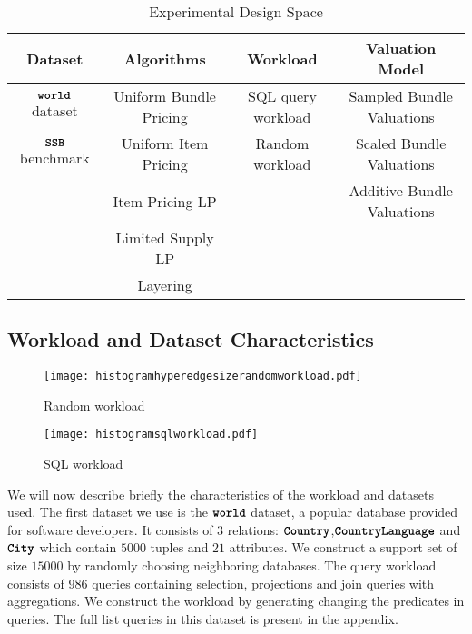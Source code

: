 \begin{table*} \centering
	\def\arraystretch{1.35}%
\begin{tabular}{c|c|c|c}
	\toprule
	\textbf{Dataset} & \textbf{Algorithms} & \textbf{Workload} & \textbf{Valuation Model}\\ \midrule
	$\texttt{\bfseries world}$ dataset & Uniform Bundle Pricing & SQL query workload & Sampled Bundle Valuations \\ 
	$\texttt{\bfseries SSB}$ benchmark & Uniform Item Pricing & Random workload & Scaled Bundle Valuations \\ 
 & Item Pricing LP &  & Additive Bundle Valuations \\ 
	 & Limited Supply LP & &  \\
	 	 & Layering &  &  \\
	\bottomrule
\end{tabular}
\caption{Experimental Design Space}
\label{table:experiments}
\end{table*}

\subsection{Workload and Dataset Characteristics}

\begin{figure}[!h]
	
	\begin{minipage}[t]{0.45\linewidth}
		\centering
		\texttt{[image: histogramhyperedgesizerandomworkload.pdf]}
		\caption{Random workload} \label{fig:histogramrandom}
	\end{minipage}
	\hspace{1cm}
	\begin{minipage}[t]{0.45\linewidth} 
		\centering
		\texttt{[image: histogramsqlworkload.pdf]}
		\caption{SQL workload} \label{fig:histogramrealqueries}
	\end{minipage}        
\end{figure}  

We will now describe briefly the characteristics of the workload and datasets used. The first dataset we use is the $\texttt{\bfseries world}$ dataset, a popular database provided for software developers. 
It consists of $3$ relations: $\texttt{\bfseries Country}$,$\texttt{\bfseries CountryLanguage}$ and $\texttt{\bfseries City}$ which contain $5000$ tuples and $21$ attributes. We construct a support set of size $15000$ by randomly choosing neighboring databases. 
The query workload consists of $986$ queries containing selection, projections and join queries with aggregations. We construct the workload by generating changing the predicates in queries. The full list queries in this dataset is present in the appendix.

